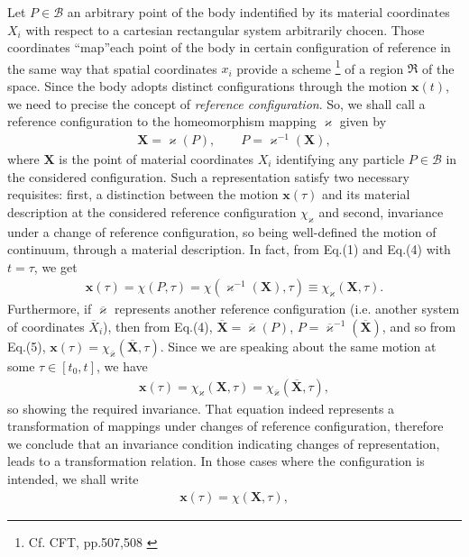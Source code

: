 \documentclass[12pt]{article}
\begin{document}
Let $P\in\mathscr{B}$ an arbitrary point of the body indentified by its material coordinates $X_i$ with respect to a cartesian rectangular system arbitrarily chocen. Those coordinates ``map''each point of the body in certain configuration of reference in the same way that spatial coordinates $x_i$ provide a scheme \footnote{Cf. \; CFT, \; pp.507,508 \cite{cite:CFT}} of a region $\Re$ of the space. Since the body adopts distinct configurations through the motion $\mathbf{x}(t)$, we need to precise the concept of {\em reference configuration}. So, we shall call a reference configuration to the homeomorphism mapping $\varkappa$ given by
\begin{align}
\mathbf{X}=\varkappa(P), \qquad P=\varkappa^{-1}(\mathbf{X}),
\end{align}
where $\mathbf{X}$ is the point of material coordinates $X_i$ identifying any particle $P\in\mathscr{B}$ in the considered configuration.
Such a representation satisfy two necessary requisites: first, a distinction between the motion $\mathbf{x}(\tau)$ and its material description at the considered reference configuration $\chi_\varkappa$ and second, invariance under a change of reference configuration, so being  well-defined the motion of  continuum, through a  material description. In fact, from Eq.(1) and Eq.(4) with $t=\tau$, we get  
\begin{align}
\mathbf{x}(\tau)=\chi(P,\tau)=\chi(\varkappa^{-1}(\mathbf{X}),\tau)\equiv\chi_\varkappa(\mathbf{X},\tau).
\end{align}
Furthermore, if $\overline{\varkappa}$ represents another reference configuration (i.e. another system of coordinates $\overline{X}_i$), then from Eq.(4), $\overline{\mathbf{X}}=\overline{\varkappa}(P)$, \; $P=\overline{\varkappa}^{-1}(\overline{\mathbf{X}})$, and so from Eq.(5), $\mathbf{x}(\tau)=\chi_{\overline{\varkappa}}(\overline{\mathbf{X}},
\tau)$. Since we are speaking about the same motion at some $\tau\in[t_0,t]$, we have
\begin{align} 
\mathbf{x}(\tau)=\chi_{\varkappa}(\mathbf{X},\tau)=\chi_{\overline{\varkappa}}(\mathbf{\overline{X}},\tau),
\end{align}
so showing  the required invariance. That equation indeed represents a transformation of mappings under changes of reference configuration, therefore we conclude that an invariance condition indicating changes of representation, leads to a transformation relation. In those cases where the configuration is intended, we shall write
\begin{align}
\mathbf{x}(\tau)=\chi(\mathbf{X},\tau),
\end{align}
\end{document}
